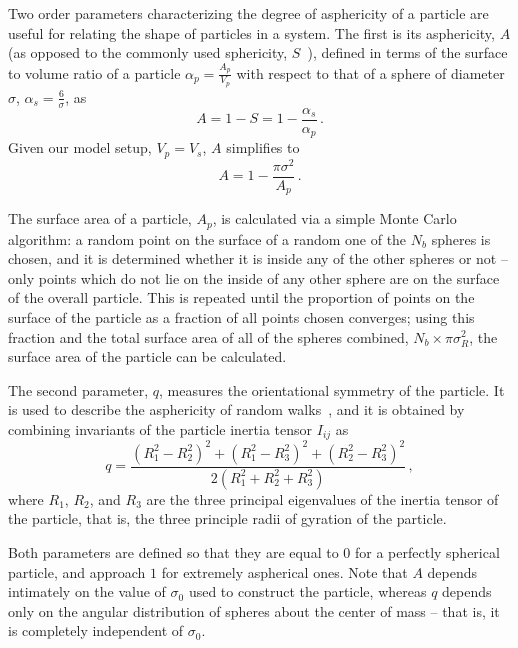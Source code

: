 Two order parameters characterizing the degree of asphericity of a particle are useful for relating the shape of particles in a system. 
The first is its asphericity, $A$ (as opposed to the commonly used sphericity, $S$~\cite{sphericity}), defined in terms of the surface to volume ratio of a particle $\alpha_p=\frac{A_p}{V_p}$ with respect to that of a sphere of diameter $\sigma$, $\alpha_s=\frac{6}{\sigma}$, as
\begin{equation}
	A = 1 - S = 1-\frac{\alpha_s}{\alpha_p} \,.
\end{equation}
Given our model setup, $V_p=V_s$, $A$ simplifies to 
\begin{equation}
	A=1-\frac{\pi\sigma^2}{A_p} \,.
\end{equation}

The surface area of a particle, $A_p$, is calculated via a simple Monte Carlo algorithm: a random point on the surface of a random one of the $N_b$ spheres is chosen, and it is determined whether it is inside any of the other spheres or not -- only points which do not lie on the inside of any other sphere are on the surface of the overall particle.
This is repeated until the proportion of points on the surface of the particle as a fraction of all points chosen converges; using this fraction and the total surface area of all of the spheres combined, $N_b \times \pi \sigma_R^2$, the surface area of the particle can be calculated.
 
The second parameter, $q$, measures the orientational symmetry  of the particle.
It is used to describe the  asphericity of random walks~\cite{rudnick}, and it is obtained by combining invariants of the particle inertia tensor $I_{ij}$  as
\begin{equation}
	q=\frac{\left(R_1^2-R_2^2\right)^2 + \left(R_1^2-R_3^2\right)^2 + \left(R_2^2-R_3^2\right)^2}{2\left(R_1^2 + R_2^2 + R_3^2\right)} \,,
\end{equation}
where $R_1$, $R_2$, and $R_3$ are the three principal eigenvalues of the inertia tensor of the particle, that is, the three principle radii of gyration of the particle.

Both parameters are defined so that they are equal to $0$ for a perfectly spherical particle, and approach $1$ for  extremely aspherical ones. 
Note that $A$ depends intimately on the value of $\sigma_0$ used to construct the particle, whereas $q$ depends only on the angular distribution of spheres about the center of mass -- that is, it is completely independent of $\sigma_0$.

